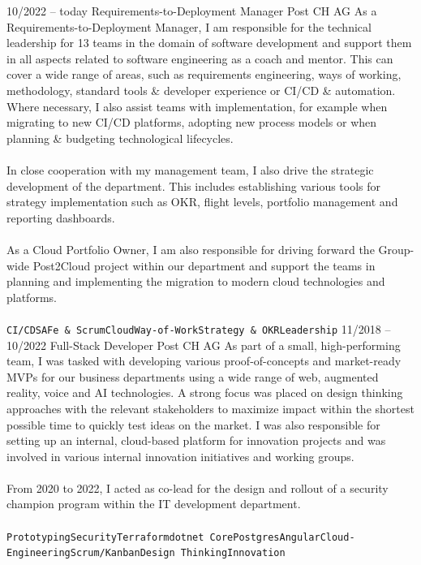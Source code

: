 \documentclass[10pt]{../developercv} %
\begin{document}
\begin{entrylist}
	\entry
	{\footnotesize 10/2022 -- today}
	{Requirements-to-Deployment Manager}
	{Post CH AG}
	{As a Requirements-to-Deployment Manager, I am responsible for the technical leadership for 13 teams in the domain of software development and support them in all aspects related to software engineering as a coach and mentor. This can cover a wide range of areas, such as requirements engineering, ways of working, methodology, standard tools \& developer experience or CI/CD \& automation. Where necessary, I also assist teams with implementation, for example when migrating to new CI/CD platforms, adopting new process models or when planning \& budgeting technological lifecycles.\\ \\
		In close cooperation with my management team, I also drive the strategic development of the department. This includes establishing various tools for strategy implementation such as OKR, flight levels, portfolio management and reporting dashboards.\\ \\
		As a Cloud Portfolio Owner, I am also responsible for driving forward the Group-wide Post2Cloud project within our department and support the teams in planning and implementing the migration to modern cloud technologies and platforms.\\ \\ \small \texttt{CI/CD}\slashsep\texttt{SAFe \& Scrum}\slashsep\texttt{Cloud}\slashsep\texttt{Way-of-Work}\slashsep\texttt{Strategy \& OKR}\slashsep\texttt{Leadership}}
	\entry
	{\footnotesize 11/2018 -- 10/2022}
	{Full-Stack Developer}
	{Post CH AG}
	{As part of a small, high-performing team, I was tasked with developing various proof-of-concepts and market-ready MVPs for our business departments using a wide range of web, augmented reality, voice and AI technologies. A strong focus was placed on design thinking approaches with the relevant stakeholders to maximize impact within the shortest possible time to quickly test ideas on the market. I was also responsible for setting up an internal, cloud-based platform for innovation projects and was involved in various internal innovation initiatives and working groups.\\ \\From 2020 to 2022, I acted as co-lead for the design and rollout of a security champion program within the IT development department.\\ \\ \small \texttt{Prototyping}\slashsep\texttt{Security}\slashsep\texttt{Terraform}\slashsep\texttt{dotnet Core}\slashsep\texttt{Postgres}\slashsep\texttt{Angular}\slashsep\texttt{Cloud-Engineering}\slashsep\texttt{Scrum/Kanban}\slashsep\texttt{Design Thinking}\slashsep\texttt{Innovation}}

\end{entrylist}
\end{document}
